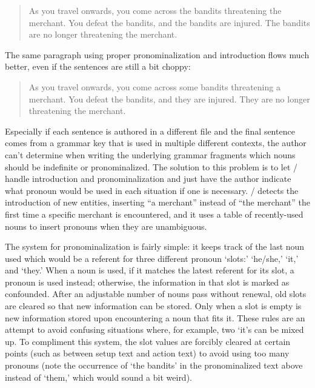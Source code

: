 \begin{quote}
  As you travel onwards, you come across the bandits threatening the merchant. You defeat the bandits, and the bandits are injured. The bandits are no longer threatening the merchant.
\end{quote}

The same paragraph using proper pronominalization and introduction flows much better, even if the sentences are still a bit choppy:

\begin{quote}
  As you travel onwards, you come across some bandits threatening a merchant. You defeat the bandits, and they are injured. They are no longer threatening the merchant.
\end{quote}

Especially if each sentence is authored in a different file and the final sentence comes from a grammar key that is used in multiple different contexts, the author can't determine when writing the underlying grammar fragments which nouns should be indefinite or pronominalized.
%
The solution to this problem is to let \dunyazad/ handle introduction and pronominalization and just have the author indicate what pronoun would be used in each situation if one is necessary.
%
\dunyazad/ detects the introduction of new entities, inserting ``a merchant'' instead of ``the merchant'' the first time a specific merchant is encountered, and it uses a table of recently-used nouns to insert pronouns when they are unambiguous.


The system for pronominalization is fairly simple: it keeps track of the last noun used which would be a referent for three different pronoun `slots:' `he/she,' `it,' and `they.'
%
When a noun is used, if it matches the latest referent for its slot, a pronoun is used instead; otherwise, the information in that slot is marked as confounded.
%
After an adjustable number of nouns pass without renewal, old slots are cleared so that new information can be stored.
%
Only when a slot is empty is new information stored upon encountering a noun that fits it.
%
These rules are an attempt to avoid confusing situations where, for example, two `it's can be mixed up.
%
To compliment this system, the slot values are forcibly cleared at certain points (such as between setup text and action text) to avoid using too many pronouns (note the occurrence of `the bandits' in the pronominalized text above instead of `them,' which would sound a bit weird).



